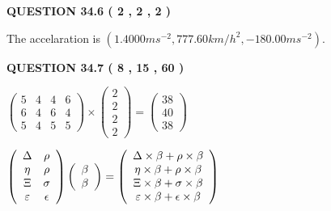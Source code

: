 \documentclass[12pt]{article}
\begin{document}
{\textbf{\Large{QUESTION
34.6 
 (           2 ,           2 ,           2 )
}}}
  
  
 
 
\noindent{}
 
 
The accelaration is
$(
1.4000ms^{-2},
777.60km/h^2,
-180.00ms^{-2}
).
$
 
 
 
 
  
\vspace{0.2in}
  
{\textbf{\Large{QUESTION
34.7 
 (           8 ,          15 ,          60 )
}}}
  
  
 
 
\noindent{}

 
$\left( \begin{array}{ccccccccccccccc}
           5  & 
           4  & 
           4  & 
           6  \\ 
           6  & 
           4  & 
           6  & 
           4  \\ 
           5  & 
           4  & 
           5  & 
           5
\end{array}\right) \times
\left( \begin{array}{c}
           2  \\ 
           2  \\ 
           2  \\ 
           2
\end{array}\right)  =
\left( \begin{array}{c}
          38  \\ 
          40  \\ 
          38
\end{array}\right)  $
 
$  %
 \left( \begin{array}
 {
 c
 c
 }
 \Delta & 
 \rho \\ 
 \eta & 
 \rho \\ 
                    \Xi & 
 \sigma \\ 
 \varepsilon & 
 \epsilon
 \end{array} \right)
 \left( \begin{array}
 {
 c
 }
 \beta \\ 
 \beta
 \end{array} \right)
=
 \left( \begin{array}
 {
 c
 }
  \Delta \times  \beta +  \rho \times  \beta \\ 
  \eta \times  \beta +  \rho \times  \beta \\ 
                     \Xi \times  \beta +  \sigma \times  \beta \\ 
  \varepsilon \times  \beta +  \epsilon \times  \beta
 \end{array} \right)
$
 
\end{document}
